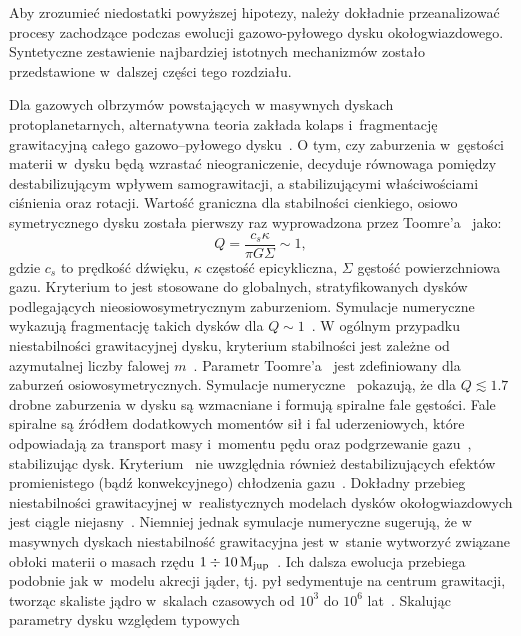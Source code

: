 \par Aby zrozumieć niedostatki powyższej hipotezy, należy
dokładnie przeanalizować procesy zachodzące podczas ewolucji gazowo-pyłowego
dysku okołogwiazdowego. Syntetyczne zestawienie najbardziej istotnych
mechanizmów zostało przedstawione w~dalszej części tego rozdziału.

\par Dla gazowych olbrzymów powstających w masywnych dyskach
protoplanetarnych, alternatywna teoria zakłada kolaps i~fragmentację
grawitacyjną całego gazowo--pyłowego dysku~\cite{Boss97}. O tym, czy zaburzenia
w~gęstości materii w~dysku będą wzrastać nieograniczenie, decyduje równowaga
pomiędzy destabilizującym wpływem samograwitacji, a stabilizującymi
właściwościami ciśnienia oraz rotacji.  Wartość graniczna dla stabilności
cienkiego, osiowo symetrycznego dysku została pierwszy raz wyprowadzona przez
Toomre'a~\cite{T64} jako:
%
\begin{equation}
   Q = \frac{c_s\kappa}{\pi G \Sigma}\sim 1,
   \label{eq:toomre}
\end{equation}
%
gdzie $c_s$ to prędkość dźwięku, $\kappa$ częstość epicykliczna, $\Sigma$
gęstość powierzchniowa gazu. Kryterium to jest stosowane do globalnych,
stratyfikowanych dysków podlegających nieosiowosymetrycznym zaburzeniom.
Symulacje numeryczne wykazują fragmentację takich dysków dla $Q\sim
1$~\cite{NBAA98}. W ogólnym przypadku niestabilności grawitacyjnej dysku,
kryterium stabilności jest zależne od azymutalnej liczby falowej
$m$~\cite{BT87}. Parametr Toomre'a~ jest zdefiniowany dla
zaburzeń osiowosymetrycznych.
Symulacje numeryczne~\cite{Duris07} pokazują, że dla $Q\lesssim 1.7$ drobne
zaburzenia w dysku są wzmacniane i formują spiralne fale gęstości. 
Fale spiralne są źródłem dodatkowych momentów sił i fal
uderzeniowych, które odpowiadają za transport masy i~momentu pędu oraz
podgrzewanie gazu~\cite{YC85}, stabilizując dysk. Kryterium~ nie
uwzględnia również destabilizujących efektów promienistego (bądź konwekcyjnego)
chłodzenia gazu~\cite{BMD06}. Dokładny przebieg niestabilności grawitacyjnej
w~realistycznych modelach dysków okołogwiazdowych jest ciągle
niejasny~\cite{MB11, LC11}. Niemniej jednak symulacje numeryczne sugerują, że w
masywnych dyskach niestabilność grawitacyjna jest w~stanie wytworzyć związane
obłoki materii o masach rzędu $1\div 10\hbox{$\mathrm{\thinspace M_{\textrm{jup}}}$}$~\cite{BHM10, FR11}. Ich dalsza
ewolucja przebiega podobnie jak w~modelu akrecji jąder, tj. pył sedymentuje na
centrum grawitacji, tworząc skaliste jądro w~skalach czasowych od $10^3$ do
$10^6$ lat~\cite{HB11, GHB12}. Skalując parametry dysku względem typowych
